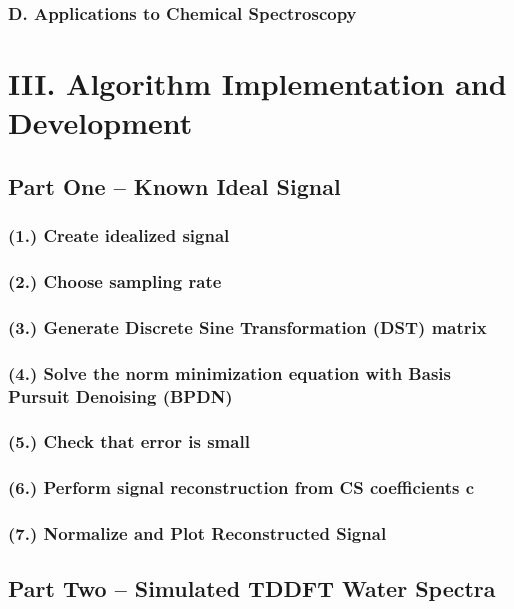 \documentclass[11pt]{article}
\begin{document}
\subsubsection*{D.	Applications to Chemical Spectroscopy}	%




\section*{III.	Algorithm Implementation and Development}
\subsection*{Part One -- Known Ideal Signal}
\subsubsection*{(1.)	Create idealized signal}
\subsubsection*{(2.)	Choose sampling rate}
\subsubsection*{(3.)	Generate Discrete Sine Transformation (DST) matrix} 
\subsubsection*{(4.)	Solve the norm minimization equation with Basis Pursuit Denoising (BPDN)}
\subsubsection*{(5.)	Check that error is small}
\subsubsection*{(6.)	Perform signal reconstruction from CS coefficients $\mathbf{c}$}
\subsubsection*{(7.)	Normalize and Plot Reconstructed Signal} 

\subsection*{Part Two -- Simulated TDDFT Water Spectra}
\end{document}
